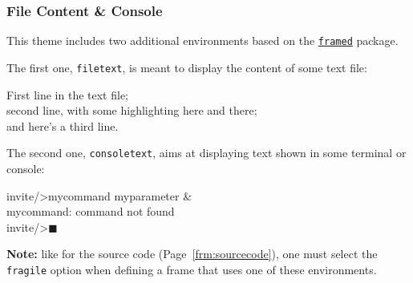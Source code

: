 \documentclass[10pt,    %
    english,            %
    xcolor=table,       %
    envcountsect,       %
    aspectratio=43      %
]{beamer}
\begin{document}
\begin{frame}[fragile]
    \frametitle{File Content \& Console}
    
    This theme includes two additional environments based on the \href{https://ctan.org/pkg/framed?lang=en}{\texttt{framed}} package.
    
    \vspace{0.25cm}
    The first one, \texttt{filetext}, is meant to display the content of some text file:
    
    \begin{filetext}[caption={Content of some text file.},label={fil:example}]
First line in the text file; \\
second line, with some highlighting \textcolor{fgRed}{here} and \colorbox{fgRed}{there}; \\
and here's a third line.
    \end{filetext}
    
    \vspace{-0.50cm}
    The second one, \texttt{consoletext}, aims at displaying text shown in some terminal or console:
    
    \begin{consoletext}[caption={Example of command lines.},label={con:example}]
invite/>mycommand myparameter \& \\
mycommand: command not found \\
invite/>$\blacksquare$
    \end{consoletext}
    
    \vspace{-0.50cm}
    {\small \textbf{Note:} like for the source code (Page~\ref{frm:sourcecode}), one must select the \texttt{fragile} option when defining a frame that uses one of these environments.}
    
\end{frame}







\end{document}

